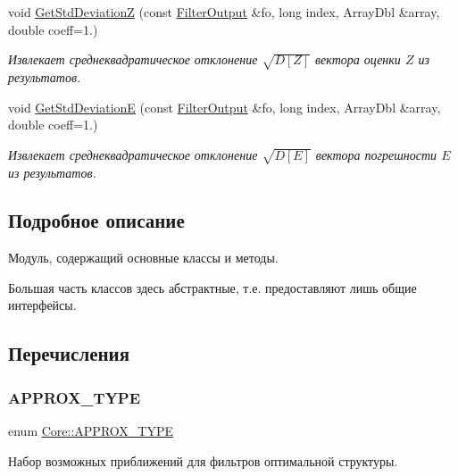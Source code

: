 \begin{DoxyCompactItemize}
void \hyperlink{namespace_core_a5e7b39380b2b293742d5eb0121af9a53}{Get\+Std\+DeviationZ} (const \hyperlink{namespace_core_a60877581a235fc9566087b54d463ce9c}{Filter\+Output} \&fo, long index, Array\+Dbl \&array, double coeff=1.)
\begin{DoxyCompactList}\small\item\em Извлекает среднеквадратическое отклонение $\sqrt{D[Z]}$ вектора оценки $Z$ из результатов. \end{DoxyCompactList}\item 
void \hyperlink{namespace_core_af3552a63b749de882ae33dbb57e6bb8c}{Get\+Std\+DeviationE} (const \hyperlink{namespace_core_a60877581a235fc9566087b54d463ce9c}{Filter\+Output} \&fo, long index, Array\+Dbl \&array, double coeff=1.)
\begin{DoxyCompactList}\small\item\em Извлекает среднеквадратическое отклонение $\sqrt{D[E]}$ вектора погрешности $E$ из результатов. \end{DoxyCompactList}\end{DoxyCompactItemize}


\subsection{Подробное описание}
Модуль, содержащий основные классы и методы. 

Большая часть классов здесь абстрактные, т.\+е. предоставляют лишь общие интерфейсы. 

\subsection{Перечисления}
\hypertarget{namespace_core_acd67f53ff1d9b21fabb1da4474a8f7d9}{}\label{namespace_core_acd67f53ff1d9b21fabb1da4474a8f7d9} 
\subsubsection{\texorpdfstring{A\+P\+P\+R\+O\+X\+\_\+\+T\+Y\+PE}{APPROX\_TYPE}}
{\footnotesize\ttfamily enum \hyperlink{namespace_core_acd67f53ff1d9b21fabb1da4474a8f7d9}{Core\+::\+A\+P\+P\+R\+O\+X\+\_\+\+T\+Y\+PE}\hspace{0.3cm}{\ttfamily [strong]}}



Набор возможных приближений для фильтров оптимальной структуры. 

